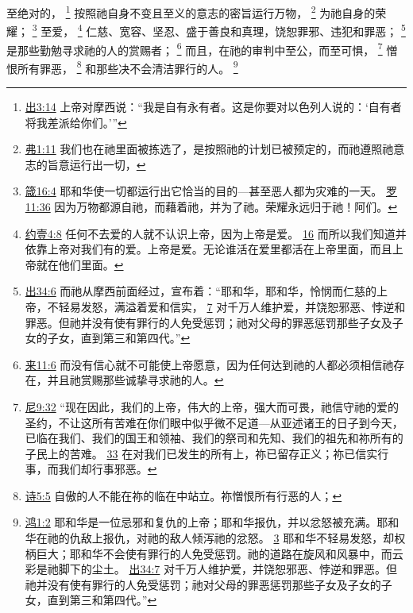 \documentclass[12pt, a4paper, oneside]{ctexart}
\begin{document}
	至绝对的，
	\footnote {
		\href{https://biblehub.com/exodus/3-14.htm}{出3:14} 上帝对摩西说：“我是自有永有者。这是你要对以色列人说的：‘自有者将我差派给你们。’”
	}
	按照祂自身不变且至义的意志的密旨运行万物，
	\footnote {
		\href{https://biblehub.com/ephesians/1-11.htm}{弗1:11} 我们也在祂里面被拣选了，是按照祂的计划已被预定的，而祂遵照祂意志的旨意运行出一切，
	}
	为祂自身的荣耀；
	\footnote {
		\href{https://biblehub.com/proverbs/16-4.htm}{箴16:4} 耶和华使一切都运行出它恰当的目的---甚至恶人都为灾难的一天。
		\href{https://biblehub.com/romans/11-36.htm}{罗11:36} 因为万物都源自祂，而藉着祂，并为了祂。荣耀永远归于祂！阿们。
	}
	至爱，
	\footnote {
		\href{https://biblehub.com/1_john/4-8.htm}{约壹4:8} 任何不去爱的人就不认识上帝，因为上帝是爱。
		\href{https://biblehub.com/1_john/4-16.htm}{16} 而所以我们知道并依靠上帝对我们有的爱。上帝是爱。无论谁活在爱里都活在上帝里面，而且上帝就在他们里面。
	}
	仁慈、宽容、坚忍、盛于善良和真理，饶恕罪邪、违犯和罪恶；
	\footnote {
		\href{https://biblehub.com/exodus/34-6.htm}{出34:6} 而祂从摩西前面经过，宣布着：“耶和华，耶和华，怜悯而仁慈的上帝，不轻易发怒，满溢着爱和信实，
		\href{https://biblehub.com/exodus/34-7.htm}{7} 对千万人维护爱，并饶恕邪恶、悖逆和罪恶。但祂并没有使有罪行的人免受惩罚；祂对父母的罪恶惩罚那些子女及子女的子女，直到第三和第四代。”
	}
	是那些勤勉寻求祂的人的赏赐者；
	\footnote {
		\href{https://biblehub.com/hebrews/11-6.htm}{来11:6} 而没有信心就不可能使上帝愿意，因为任何达到祂的人都必须相信祂存在，并且祂赏赐那些诚挚寻求祂的人。
	}
	而且，在祂的审判中至公，而至可惧，
	\footnote {
		\href{https://biblehub.com/nehemiah/9-32.htm}{尼9:32} “现在因此，我们的上帝，伟大的上帝，强大而可畏，祂信守祂的爱的圣约，不让这所有苦难在你们眼中似乎微不足道---从亚述诸王的日子到今天，已临在我们、我们的国王和领袖、我们的祭司和先知、我们的祖先和祢所有的子民上的苦难。
		\href{https://biblehub.com/nehemiah/9-33.htm}{33} 在对我们已发生的所有上，祢已留存正义；祢已信实行事，而我们却行事邪恶。
	}
	憎恨所有罪恶，
	\footnote {
		\href{https://biblehub.com/psalms/5-5.htm}{诗5:5} 自傲的人不能在祢的临在中站立。祢憎恨所有行恶的人；
	}
	和那些决不会清洁罪行的人。
	\footnote {
		\href{https://biblehub.com/nahum/1-2.htm}{鸿1:2} 耶和华是一位忌邪和复仇的上帝；耶和华报仇，并以忿怒被充满。耶和华在祂的仇敌上报仇，对祂的敌人倾泻祂的忿怒。
		\href{https://biblehub.com/nahum/1-3.htm}{3} 耶和华不轻易发怒，却权柄巨大；耶和华不会使有罪行的人免受惩罚。祂的道路在旋风和风暴中，而云彩是祂脚下的尘土。
		\href{https://biblehub.com/exodus/34-7.htm}{出34:7} 对千万人维护爱，并饶恕邪恶、悖逆和罪恶。但祂并没有使有罪行的人免受惩罚；祂对父母的罪恶惩罚那些子女及子女的子女，直到第三和第四代。”
	}
\end{document}
